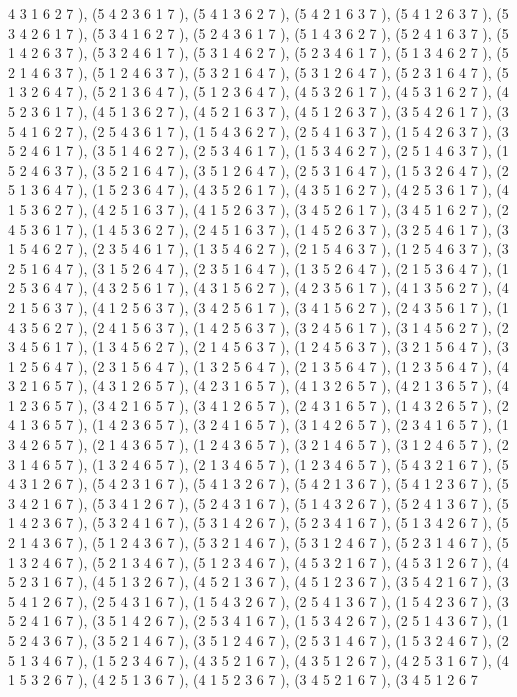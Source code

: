 \documentclass[12pt]{article}
\begin{document}
\begin{enumerate}
4 3 1 6 2 7  ), (5 4 2 3 6 1 7  ), (5 4 1 3 6 2 7  ), (5 4 2 1 6 3 7  ), (5 4 1 2 6 3 7  ), (5 3 4 2 6 1 7  ), (5 3 4 1 6 2 7  ), (5 2 4 3 6 1 7  ), (5 1 4 3 6 2 7  ), (5 2 4 1 6 3 7  ), (5 1 4 2 6 3 7  ), (5 3 2 4 6 1 7  ), (5 3 1 4 6 2 7  ), (5 2 3 4 6 1 7  ), (5 1 3 4 6 2 7  ), (5 2 1 4 6 3 7  ), (5 1 2 4 6 3 7  ), (5 3 2 1 6 4 7  ), (5 3 1 2 6 4 7  ), (5 2 3 1 6 4 7  ), (5 1 3 2 6 4 7  ), (5 2 1 3 6 4 7  ), (5 1 2 3 6 4 7  ), (4 5 3 2 6 1 7  ), (4 5 3 1 6 2 7  ), (4 5 2 3 6 1 7  ), (4 5 1 3 6 2 7  ), (4 5 2 1 6 3 7  ), (4 5 1 2 6 3 7  ), (3 5 4 2 6 1 7  ), (3 5 4 1 6 2 7  ), (2 5 4 3 6 1 7  ), (1 5 4 3 6 2 7  ), (2 5 4 1 6 3 7  ), (1 5 4 2 6 3 7  ), (3 5 2 4 6 1 7  ), (3 5 1 4 6 2 7  ), (2 5 3 4 6 1 7  ), (1 5 3 4 6 2 7  ), (2 5 1 4 6 3 7  ), (1 5 2 4 6 3 7  ), (3 5 2 1 6 4 7  ), (3 5 1 2 6 4 7  ), (2 5 3 1 6 4 7  ), (1 5 3 2 6 4 7  ), (2 5 1 3 6 4 7  ), (1 5 2 3 6 4 7  ), (4 3 5 2 6 1 7  ), (4 3 5 1 6 2 7  ), (4 2 5 3 6 1 7  ), (4 1 5 3 6 2 7  ), (4 2 5 1 6 3 7  ), (4 1 5 2 6 3 7  ), (3 4 5 2 6 1 7  ), (3 4 5 1 6 2 7  ), (2 4 5 3 6 1 7  ), (1 4 5 3 6 2 7  ), (2 4 5 1 6 3 7  ), (1 4 5 2 6 3 7  ), (3 2 5 4 6 1 7  ), (3 1 5 4 6 2 7  ), (2 3 5 4 6 1 7  ), (1 3 5 4 6 2 7  ), (2 1 5 4 6 3 7  ), (1 2 5 4 6 3 7  ), (3 2 5 1 6 4 7  ), (3 1 5 2 6 4 7  ), (2 3 5 1 6 4 7  ), (1 3 5 2 6 4 7  ), (2 1 5 3 6 4 7  ), (1 2 5 3 6 4 7  ), (4 3 2 5 6 1 7  ), (4 3 1 5 6 2 7  ), (4 2 3 5 6 1 7  ), (4 1 3 5 6 2 7  ), (4 2 1 5 6 3 7  ), (4 1 2 5 6 3 7  ), (3 4 2 5 6 1 7  ), (3 4 1 5 6 2 7  ), (2 4 3 5 6 1 7  ), (1 4 3 5 6 2 7  ), (2 4 1 5 6 3 7  ), (1 4 2 5 6 3 7  ), (3 2 4 5 6 1 7  ), (3 1 4 5 6 2 7  ), (2 3 4 5 6 1 7  ), (1 3 4 5 6 2 7  ), (2 1 4 5 6 3 7  ), (1 2 4 5 6 3 7  ), (3 2 1 5 6 4 7  ), (3 1 2 5 6 4 7  ), (2 3 1 5 6 4 7  ), (1 3 2 5 6 4 7  ), (2 1 3 5 6 4 7  ), (1 2 3 5 6 4 7  ), (4 3 2 1 6 5 7  ), (4 3 1 2 6 5 7  ), (4 2 3 1 6 5 7  ), (4 1 3 2 6 5 7  ), (4 2 1 3 6 5 7  ), (4 1 2 3 6 5 7  ), (3 4 2 1 6 5 7  ), (3 4 1 2 6 5 7  ), (2 4 3 1 6 5 7  ), (1 4 3 2 6 5 7  ), (2 4 1 3 6 5 7  ), (1 4 2 3 6 5 7  ), (3 2 4 1 6 5 7  ), (3 1 4 2 6 5 7  ), (2 3 4 1 6 5 7  ), (1 3 4 2 6 5 7  ), (2 1 4 3 6 5 7  ), (1 2 4 3 6 5 7  ), (3 2 1 4 6 5 7  ), (3 1 2 4 6 5 7  ), (2 3 1 4 6 5 7  ), (1 3 2 4 6 5 7  ), (2 1 3 4 6 5 7  ), (1 2 3 4 6 5 7  ), (5 4 3 2 1 6 7  ), (5 4 3 1 2 6 7  ), (5 4 2 3 1 6 7  ), (5 4 1 3 2 6 7  ), (5 4 2 1 3 6 7  ), (5 4 1 2 3 6 7  ), (5 3 4 2 1 6 7  ), (5 3 4 1 2 6 7  ), (5 2 4 3 1 6 7  ), (5 1 4 3 2 6 7  ), (5 2 4 1 3 6 7  ), (5 1 4 2 3 6 7  ), (5 3 2 4 1 6 7  ), (5 3 1 4 2 6 7  ), (5 2 3 4 1 6 7  ), (5 1 3 4 2 6 7  ), (5 2 1 4 3 6 7  ), (5 1 2 4 3 6 7  ), (5 3 2 1 4 6 7  ), (5 3 1 2 4 6 7  ), (5 2 3 1 4 6 7  ), (5 1 3 2 4 6 7  ), (5 2 1 3 4 6 7  ), (5 1 2 3 4 6 7  ), (4 5 3 2 1 6 7  ), (4 5 3 1 2 6 7  ), (4 5 2 3 1 6 7  ), (4 5 1 3 2 6 7  ), (4 5 2 1 3 6 7  ), (4 5 1 2 3 6 7  ), (3 5 4 2 1 6 7  ), (3 5 4 1 2 6 7  ), (2 5 4 3 1 6 7  ), (1 5 4 3 2 6 7  ), (2 5 4 1 3 6 7  ), (1 5 4 2 3 6 7  ), (3 5 2 4 1 6 7  ), (3 5 1 4 2 6 7  ), (2 5 3 4 1 6 7  ), (1 5 3 4 2 6 7  ), (2 5 1 4 3 6 7  ), (1 5 2 4 3 6 7  ), (3 5 2 1 4 6 7  ), (3 5 1 2 4 6 7  ), (2 5 3 1 4 6 7  ), (1 5 3 2 4 6 7  ), (2 5 1 3 4 6 7  ), (1 5 2 3 4 6 7  ), (4 3 5 2 1 6 7  ), (4 3 5 1 2 6 7  ), (4 2 5 3 1 6 7  ), (4 1 5 3 2 6 7  ), (4 2 5 1 3 6 7  ), (4 1 5 2 3 6 7  ), (3 4 5 2 1 6 7  ), (3 4 5 1 2 6 7 
\end{enumerate}
\end{document}
